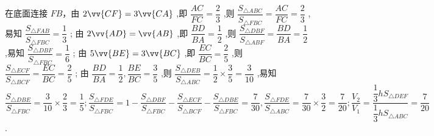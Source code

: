 \begin{enumerate}
\begin{jieda}
        在底面连接 ${FB}$，由 $2\vv{CF} = 3\vv{CA}$ ,即 $\dfrac{AC}{FC} = \dfrac{2}{3}$ ,则 $\dfrac{{S}_{\bigtriangleup {ABC}}}{{S}_{\bigtriangleup {FBC}}} = \dfrac{AC}{FC} = \dfrac{2}{3}$ ,易知 $\dfrac{{S}_{\bigtriangleup {FAB}}}{{S}_{\bigtriangleup {FBC}}}  = \dfrac{1}{3}$ ; 由 $2\vv{AD} = \vv{AB}$ ,即 $\dfrac{BD}{BA} = \dfrac{1}{2}$ ,则 $\dfrac{{S}_{\bigtriangleup {DBF}}}{{S}_{\bigtriangleup {ABF}}} = \dfrac{BD}{BA} = \dfrac{1}{2}$ ,易知 $\dfrac{{S}_{\bigtriangleup {DBF}}}{{S}_{\bigtriangleup {FBC}}} = \dfrac{1}{6}$ ; 由 $5\vv{BE} = 3\vv{BC}$ ,即 $\dfrac{EC}{BC} = \dfrac{2}{5}$ ,则 $\dfrac{{S}_{\bigtriangleup {ECF}}}{{S}_{\bigtriangleup {BCF}}} = \dfrac{EC}{BC} =  \dfrac{2}{5}$ ; 由 $\dfrac{BD}{BA} = \dfrac{1}{2},\dfrac{BE}{BC} = \dfrac{3}{5}$ ,则 $\dfrac{{S}_{\bigtriangleup {DEB}}}{{S}_{\bigtriangleup {ABC}}} = \dfrac{1}{2} \times  \dfrac{3}{5} = \dfrac{3}{10}$ ,易知 $\dfrac{{S}_{\bigtriangleup {DBE}}}{{S}_{\bigtriangleup {FBC}}} = \dfrac{3}{10} \times  \dfrac{2}{3} = \dfrac{1}{5};\dfrac{{S}_{\bigtriangleup {FDE}}}{{S}_{\bigtriangleup {FBC}}} = 1 - \dfrac{{S}_{\bigtriangleup {DBF}}}{{S}_{\bigtriangleup {FBC}}} - \dfrac{{S}_{\bigtriangleup {ECF}}}{{S}_{\bigtriangleup {BCF}}} - \dfrac{{S}_{\bigtriangleup {DBE}}}{{S}_{\bigtriangleup {FBC}}} =  \dfrac{7}{30},\dfrac{{S}_{\bigtriangleup {FDE}}}{{S}_{\bigtriangleup {ABC}}} = \dfrac{7}{30} \times  \dfrac{3}{2} = \dfrac{7}{20};\dfrac{{V}_{2}}{{V}_{1}} = \dfrac{\dfrac{1}{3}h{S}_{\bigtriangleup {DEF}}}{\dfrac{1}{3}h{S}_{\bigtriangleup {ABC}}} = \dfrac{7}{20}$ .
    \end{jieda}


\end{enumerate}
